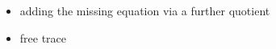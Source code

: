 \begin{itemize}
	\item adding the missing equation via a further quotient
	\item free trace
\end{itemize}



%	





